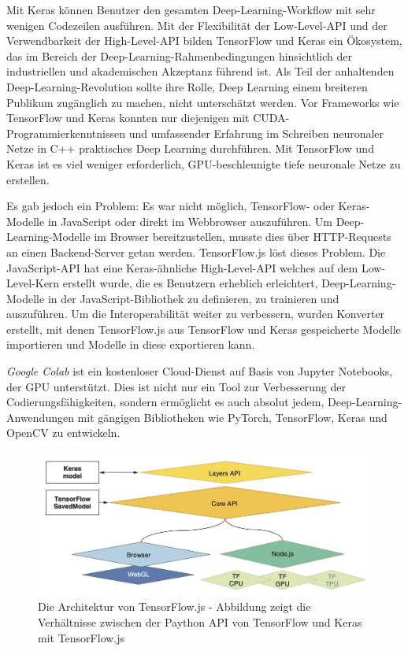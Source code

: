 Mit Keras können Benutzer den gesamten Deep-Learning-Workflow mit sehr wenigen Codezeilen ausführen. Mit der Flexibilität der Low-Level-API und der Verwendbarkeit der High-Level-API bilden TensorFlow und Keras ein Ökosystem, das im Bereich der Deep-Learning-Rahmenbedingungen hinsichtlich der industriellen und akademischen Akzeptanz führend ist. Als Teil der anhaltenden Deep-Learning-Revolution sollte ihre Rolle, Deep Learning einem breiteren Publikum zugänglich zu machen, nicht unterschätzt werden. Vor Frameworks wie TensorFlow und Keras konnten nur diejenigen mit CUDA-Programmierkenntnissen und umfassender Erfahrung im Schreiben neuronaler Netze in C++ praktisches Deep Learning durchführen. Mit TensorFlow und Keras ist es viel weniger erforderlich, GPU-beschleunigte tiefe neuronale Netze zu erstellen.

Es gab jedoch ein Problem: Es war nicht möglich, TensorFlow- oder Keras-Modelle in JavaScript oder direkt im Webbrowser auszuführen. Um Deep-Learning-Modelle im Browser bereitzustellen, musste dies über HTTP-Requests an einen Backend-Server getan werden. TensorFlow.js löst dieses Problem. Die JavaScript-API hat eine Keras-ähnliche High-Level-API welches auf dem Low-Level-Kern erstellt wurde, die es Benutzern erheblich erleichtert, Deep-Learning-Modelle in der JavaScript-Bibliothek zu definieren, zu trainieren und auszuführen. Um die Interoperabilität weiter zu verbessern, wurden Konverter erstellt, mit denen TensorFlow.js aus TensorFlow und Keras gespeicherte Modelle importieren und Modelle in diese exportieren kann.


\textit{Google Colab} ist ein kostenloser Cloud-Dienst auf Basis von Jupyter Notebooks, der GPU unterstützt. Dies ist nicht nur ein  Tool zur Verbesserung der Codierungsfähigkeiten, sondern ermöglicht es auch absolut jedem, Deep-Learning-Anwendungen mit gängigen Bibliotheken wie PyTorch, TensorFlow, Keras und OpenCV zu entwickeln.

 \begin{figure}[H]
     \centering
     \includegraphics[width=12cm]{kapitel5/tfjsarch.png}
     \caption[Die Architektur von TensorFlow.js]{Die Architektur von TensorFlow.js - Abbildung zeigt die Verhältnisse zwischen der Paython API von TensorFlow und Keras mit TensorFlow.js}
     \label{Kap5:tfjsarch}
 \end{figure}

